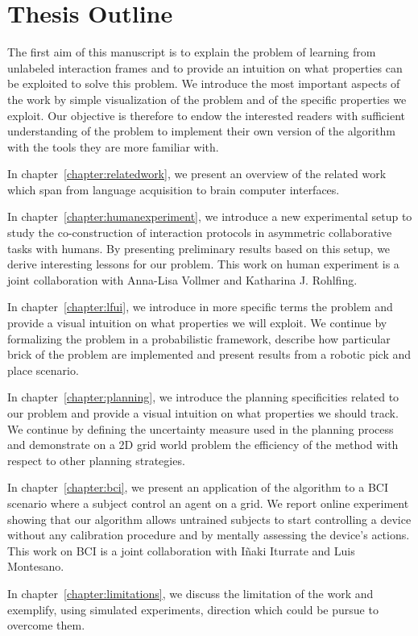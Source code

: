 \section{Thesis Outline}

The first aim of this manuscript is to explain the problem of learning from unlabeled interaction frames and to provide an intuition on what properties can be exploited to solve this problem. We introduce the most important aspects of the work by simple visualization of the problem and of the specific properties we exploit. Our objective is therefore to endow the interested readers with sufficient understanding of the problem to implement their own version of the algorithm with the tools they are more familiar with.

In chapter~\ref{chapter:relatedwork}, we present an overview of the related work which span from language acquisition to brain computer interfaces.

In chapter~\ref{chapter:humanexperiment}, we introduce a new experimental setup to study the co-construction of interaction protocols in asymmetric collaborative tasks with humans. By presenting preliminary results based on this setup, we derive interesting lessons for our problem. This work on human experiment is a joint collaboration with Anna-Lisa Vollmer and Katharina J. Rohlfing. 

In chapter~\ref{chapter:lfui}, we introduce in more specific terms the problem and provide a visual intuition on what properties we will exploit. We continue by formalizing the problem in a probabilistic framework, describe how particular brick of the problem are implemented and present results from a robotic pick and place scenario.

In chapter~\ref{chapter:planning}, we introduce the planning specificities related to our problem and provide a visual intuition on what properties we should track. We continue by defining the uncertainty measure used in the planning process and demonstrate on a 2D grid world problem the efficiency of the method with respect to other planning strategies.

In chapter~\ref{chapter:bci}, we present an application of the algorithm to a BCI scenario where a subject control an agent on a grid. We report online experiment showing that our algorithm allows untrained subjects to start controlling a device without any calibration procedure and by mentally assessing the device's actions. This work on BCI is a joint collaboration with I{\~n}aki Iturrate and Luis Montesano.

In chapter~\ref{chapter:limitations}, we discuss the limitation of the work and exemplify, using simulated experiments, direction which could be pursue to overcome them.